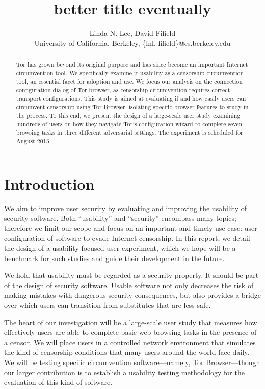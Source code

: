\documentclass[letterpaper,twocolumn,11pt]{article}
\begin{document}
\title{{\color {red}better title eventually}}
\author{Linda N. Lee, David Fifield\\
University of California, Berkeley, \{lnl, fifield\}@cs.berkeley.edu
}
\maketitle
 
\begin{abstract}
\indent \indent Tor has grown beyond its original purpose and has  since become an important 
Internet circumvention tool. We specifically examine it usability as a censorship circumvention tool, 
an essential facet for adoption and use.  We focus our analysis on the connection configuration dialog of 
Tor browser, as censorship circumvention requires correct transport configurations. 
This study is aimed at evaluating if and how easily users can circumvent censorship using Tor Browser,
isolating specific browser features to study in the process.  To this end, we present the design of
 a large-scale user study examining hundreds of users  on how they navigate Tor's configuration wizard to complete seven browsing tasks in three different adversarial settings. The experiment is scheduled for August 2015.
\end{abstract}

\section{Introduction} %

\indent \indent We aim to improve user security by evaluating
and improving the usability of security software.
Both ``usability'' and ``security'' encompass many topics;
therefore we limit our scope and focus on
an important and timely use case:
user configuration of software to evade Internet censorship.
In this report, we detail the design of a usability-focused user experiment,
which we hope will be a benchmark for such studies
and guide their development in the future.

We hold that usability must be regarded as a security property.
It should be part of the design of security software.
Usable software not only decreases the risk of making mistakes
with dangerous security consequences,
but also provides a bridge over which users can
transition from substitutes that are less safe.

The heart of our investigation will be a large-scale user study
that measures how effectively users are able to complete
basic web browsing tasks in the presence of a censor.
We will place users in a controlled network environment
that simulates the kind of censorship conditions that many
users around the world face daily.
We will be testing specific circumvention software---namely,
Tor Browser---though our larger contribution is to establish
a usability testing methodology for the evaluation
of this kind of software.
\end{document}
